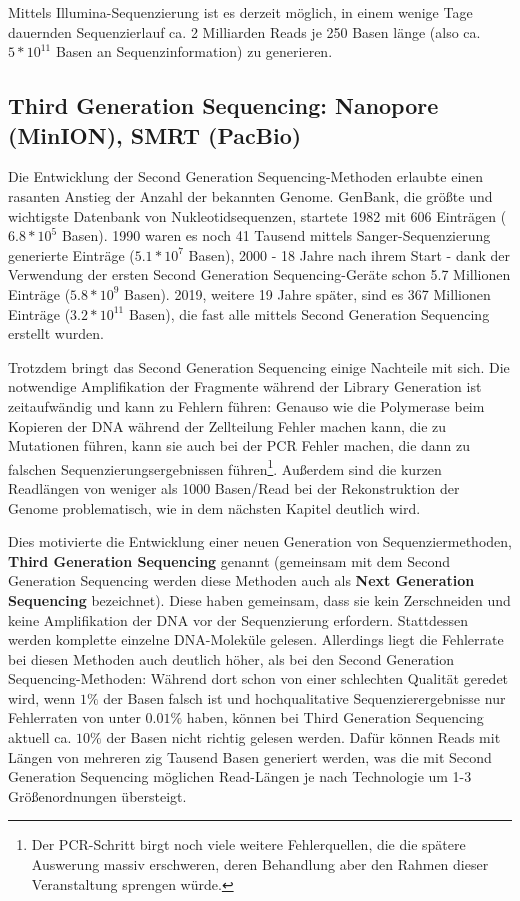 Mittels Illumina-Sequenzierung ist es derzeit möglich, in einem wenige Tage dauernden Sequenzierlauf ca. 2 Milliarden Reads je 250 Basen länge (also ca. $5*10^{11}$ Basen an Sequenzinformation) zu generieren.

\subsection{Third Generation Sequencing: Nanopore (MinION), SMRT (PacBio)}

Die Entwicklung der Second Generation Sequencing-Methoden erlaubte einen rasanten Anstieg der Anzahl der bekannten Genome. GenBank, die größte und wichtigste Datenbank von Nukleotidsequenzen, startete 1982 mit 606 Einträgen ($6.8 * 10^5$ Basen). 1990 waren es noch 41 Tausend mittels Sanger-Sequenzierung generierte Einträge ($5.1*10^7$ Basen), 2000 - 18 Jahre nach ihrem Start - dank der Verwendung der ersten Second Generation Sequencing-Geräte schon 5.7 Millionen Einträge ($5.8 * 10^9$ Basen). 2019, weitere 19 Jahre später, sind es 367 Millionen Einträge ($3.2 * 10^{11}$ Basen), die fast alle mittels Second Generation Sequencing erstellt wurden. 

Trotzdem bringt das Second Generation Sequencing einige Nachteile mit sich. Die notwendige Amplifikation der Fragmente während der Library Generation ist zeitaufwändig und kann zu Fehlern führen: Genauso wie die Polymerase beim Kopieren der DNA während der Zellteilung Fehler machen kann, die zu Mutationen führen, kann sie auch bei der PCR Fehler machen, die dann zu falschen Sequenzierungsergebnissen führen\footnote{Der PCR-Schritt birgt noch viele weitere Fehlerquellen, die die spätere Auswerung massiv erschweren, deren Behandlung aber den Rahmen dieser Veranstaltung sprengen würde.}. Außerdem sind die kurzen Readlängen von weniger als 1000 Basen/Read bei der Rekonstruktion der Genome problematisch, wie in dem nächsten Kapitel deutlich wird.

Dies motivierte die Entwicklung einer neuen Generation von Sequenziermethoden, \textbf{Third Generation Sequencing} genannt (gemeinsam mit dem Second Generation Sequencing werden diese Methoden auch als \textbf{Next Generation Sequencing} bezeichnet). Diese haben gemeinsam, dass sie kein Zerschneiden und keine Amplifikation der DNA vor der Sequenzierung erfordern. Stattdessen werden komplette einzelne DNA-Moleküle gelesen. Allerdings liegt die Fehlerrate bei diesen Methoden auch deutlich höher, als bei den Second Generation Sequencing-Methoden: Während dort schon von einer schlechten Qualität geredet wird, wenn $1\%$ der Basen falsch ist und hochqualitative Sequenzierergebnisse nur Fehlerraten von unter $0.01\%$ haben, können bei Third Generation Sequencing aktuell ca. $10\%$ der Basen nicht richtig gelesen werden. Dafür können Reads mit Längen von mehreren zig Tausend Basen generiert werden, was die mit Second Generation Sequencing möglichen Read-Längen je nach Technologie um 1-3 Größenordnungen übersteigt. 

